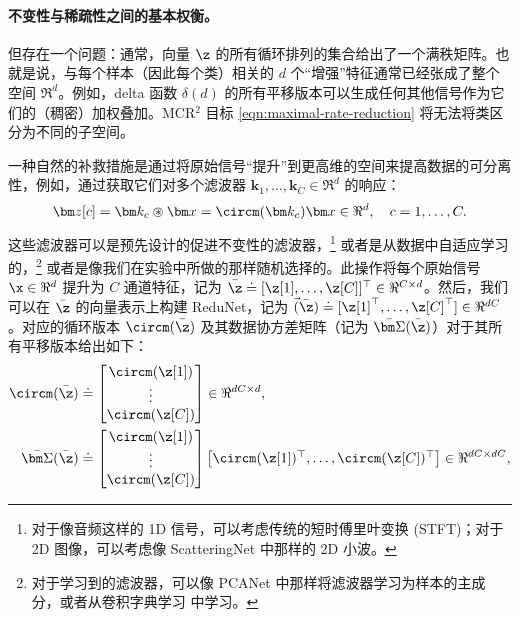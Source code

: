 \documentclass[../../book-main_zh.tex]{subfiles}
\begin{document}
\paragraph{不变性与稀疏性之间的基本权衡。} 但存在一个问题：通常，向量 $\z$ 的所有循环排列的集合给出了一个满秩矩阵。也就是说，与每个样本（因此每个类）相关的 $d$ 个“增强”特征通常已经张成了整个空间 $\Re^d$。例如，delta 函数 $\delta(d)$ 的所有平移版本可以生成任何其他信号作为它们的（稠密）加权叠加。MCR$^2$ 目标 \eqref{eqn:maximal-rate-reduction} 将无法将类区分为不同的子空间。

一种自然的补救措施是通过将原始信号“提升”到更高维的空间来提高数据的可分离性，例如，通过获取它们对多个滤波器 $\bm k_1, \ldots, \bm k_C \in \Re^d$ 的响应：
\begin{equation}
    \bm z[c] = \bm k_c \circledast \bm x  =  \circm(\bm k_c) \bm x
    \in \Re^d, \quad c = 1, \ldots, C.
    \label{eqn:lift-1d}
\end{equation}
这些滤波器可以是预先设计的促进不变性的滤波器，\footnote{对于像音频这样的 1D 信号，可以考虑传统的短时傅里叶变换 (STFT)；对于 2D 图像，可以考虑像 ScatteringNet \cite{scattering-net} 中那样的 2D 小波。} 或者是从数据中自适应学习的，\footnote{对于学习到的滤波器，可以像 PCANet \cite{chan2015pcanet} 中那样将滤波器学习为样本的主成分，或者从卷积字典学习 \cite{li2019multichannel,qu2019nonconvex} 中学习。} 或者是像我们在实验中所做的那样随机选择的。此操作将每个原始信号 $\x \in \Re^d$ 提升为 $C$ 通道特征，记为 $\bar{\z}  \doteq
[\z[1], \ldots, \z[C]]^\top \in \Re^{C\times d}$。然后，我们可以在 $\bar{\z}$ 的向量表示上构建 ReduNet，记为 $\vec(\bar\z) \doteq [\z[1]^\top, \ldots, \z[C]^\top] \in \Re^{dC}$。对应的循环版本 $ \circm(\bar{\z})$ 及其数据协方差矩阵（记为 $\bar{\bm \Sigma}(\bar\z)$）对于其所有平移版本给出如下：
\begin{equation}
    \begin{aligned}
        \circm(\bar{\z}) &\doteq \left[
            \begin{matrix}
                \circm(\z[1])  \\ \vdots \\ \circm(\z[C])
        \end{matrix} \right] \in \Re^{dC\times d},
        \\
        \bar{\bm \Sigma}(\bar\z) &\doteq
        \left[
            \begin{matrix}
                \circm(\z[1]) \\ \vdots \\ \circm(\z[C])
        \end{matrix} \right]\left[
            \begin{matrix}\circm(\z[1])^\top,\ldots, \circm(\z[C])^\top
        \end{matrix} \right] \in \Re^{dC\times dC},
        \label{eqn:W-multichannel}
    \end{aligned}
\end{equation}
\end{document}
